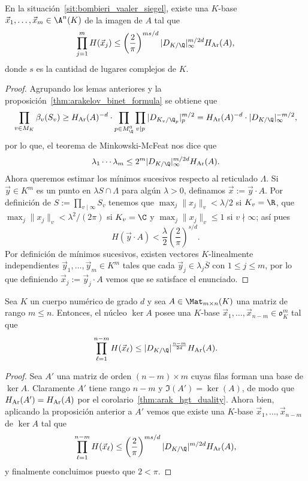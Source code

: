 \documentclass[teoria-numeros.tex]{subfiles}
\begin{document}
\begin{prop}
	En la situación~\ref{sit:bombieri_vaaler_siegel}, existe una $K$-base $\vec x_1, \dots, \vec x_m \in \A^n(K)$ de la imagen de $A$ tal que
	$$ \prod_{j=1}^{m} H(\vec x_j) \le \left( \frac{2}{\pi} \right)^{ms/d} |D_{K/\Q}|_\infty^{m/2d} H_\Ar(A), $$
	donde $s$ es la cantidad de lugares complejos de $K$.
\end{prop}
\begin{proof}
	Agrupando los lemas anteriores y la proposición~\ref{thm:arakelov_binet_formula} se obtiene que
	\[
		\prod_{v\in M_K} \beta_v(S_v) \ge H_\Ar(A)^{-d} \cdot \prod_{p \in M_\Q^0} \prod_{v\mid p} |D_{K_v/\Q_p}|_p^{m/2}
		= H_\Ar(A)^{-d}\cdot |D_{K/\Q}|_\infty^{-m/2},
	\]
	por lo que, el teorema de Minkowski-McFeat nos dice que
	$$ \lambda_1 \cdots \lambda_m \le 2^m |D_{K/\Q}|_\infty^{m/2d} H_\Ar(A). $$
	Ahora queremos estimar los mínimos sucesivos respecto al reticulado $\Lambda$.
	Si $\vec y \in K^m$ es un punto en $\lambda S \cap \Lambda$ para algún $\lambda > 0$, definamos $\vec x := \vec y \cdot A$.
	Por definición de $S := \prod_{v\mid \infty} S_v$ tenemos que $\max_j \|x_j\|_v < \lambda/2$ si $K_v = \R$,
	que $\max_j \|x_j\|_v < \lambda^2/(2\pi)$ si $K_v = \C$ y $\max_j \|x_j\|_v \le 1$ si $v \nmid \infty$; así pues
	$$ H(\vec y\cdot A) < \frac{\lambda}{2} \left( \frac{2}{\pi} \right)^{s/d}. $$
	Por definición de mínimos sucesivos, existen vectores $K$-linealmente independientes $\vec y_1, \dots, \vec y_m \in K^m$
	tales que cada $\vec y_j \in \lambda_j \overline{S}$ con $1 \le j \le m$, por lo que definiendo $\vec x_j := \vec y_j\cdot A$
	vemos que se satisface el enunciado.
\end{proof}

\begin{thm}
	Sea $K$ un cuerpo numérico de grado $d$ y sea $A \in \Mat_{m\times n}(K)$ una matriz de rango $m \le n$.
	Entonces, el núcleo $\ker A$ posee una $K$-base $\vec x_1, \dots, \vec x_{n-m} \in \mathfrak{o}_K^m$ tal que
	$$ \prod_{\ell=1}^{n-m} H(\vec x_\ell) \le |D_{K/\Q}|^{ \frac{n-m}{2d} } H_\Ar(A). $$
\end{thm}
\begin{proof}
	Sea $A'$ una matriz de orden $(n-m)\times m$ cuyas filas forman una base de $\ker A$.
	Claramente $A'$ tiene rango $n-m$ y $\Im(A') = \ker(A)$, de modo que $H_{\mathrm{Ar}}(A') = H_{\mathrm{Ar}}(A)$ por el corolario~\ref{thm:arak_hgt_duality}.
	Ahora bien, aplicando la proposición anterior a $A'$ vemos que existe una $K$-base $\vec x_1, \dots, \vec x_{n-m}$ de $\ker A$
	tal que
	$$ \prod_{\ell=1}^{n-m} H(\vec x_\ell) \le \left( \frac{2}{\pi} \right)^{ms/d} |D_{K/\Q}|^{m/2d} H_\Ar(A), $$
	y finalmente concluimos puesto que $2 < \pi$.
\end{proof}
\end{document}
